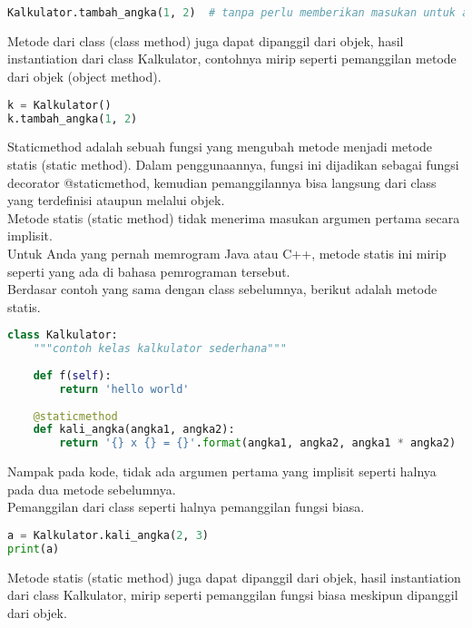 \begin{lstlisting}[language=Python]
Kalkulator.tambah_angka(1, 2)  # tanpa perlu memberikan masukan untuk argumen cls
\end{lstlisting}

Metode dari class (class method) juga dapat dipanggil dari objek, hasil instantiation dari class Kalkulator, contohnya mirip seperti pemanggilan metode dari objek (object method).

\begin{lstlisting}[language=Python]
k = Kalkulator()
k.tambah_angka(1, 2)
\end{lstlisting}

Staticmethod adalah sebuah fungsi yang mengubah metode menjadi metode statis (static method). Dalam penggunaannya, fungsi ini dijadikan sebagai fungsi decorator @staticmethod, kemudian pemanggilannya bisa langsung dari class yang terdefinisi ataupun melalui objek.\\
Metode statis (static method) tidak menerima masukan argumen pertama secara implisit.\\

Untuk Anda yang pernah memrogram Java atau C++, metode statis ini mirip seperti yang ada di bahasa pemrograman tersebut.\\

Berdasar contoh yang sama dengan class sebelumnya, berikut adalah metode statis.\\

\begin{lstlisting}[language=Python]
class Kalkulator:
    """contoh kelas kalkulator sederhana"""
 
    def f(self):
        return 'hello world'
 
    @staticmethod
    def kali_angka(angka1, angka2):
        return '{} x {} = {}'.format(angka1, angka2, angka1 * angka2)
\end{lstlisting}

Nampak pada kode, tidak ada argumen pertama yang implisit seperti halnya pada dua metode sebelumnya.\\

Pemanggilan dari class seperti halnya pemanggilan fungsi biasa.\\

\begin{lstlisting}[language=Python]
a = Kalkulator.kali_angka(2, 3)
print(a)
\end{lstlisting}

Metode statis (static method) juga dapat dipanggil dari objek, hasil instantiation dari class Kalkulator, mirip seperti pemanggilan fungsi biasa meskipun dipanggil dari objek.

